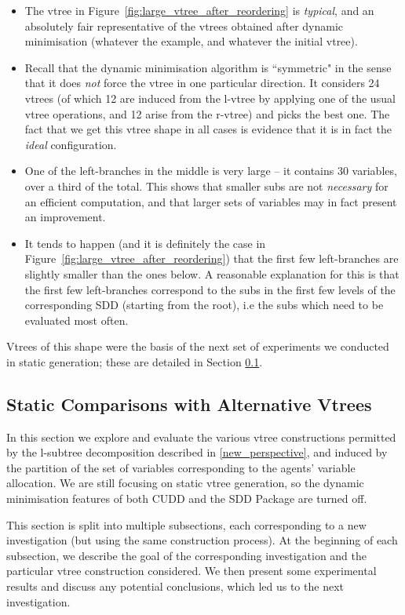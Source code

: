 \documentclass[11pt]{article}
\begin{document}
\begin{itemize}
\item The vtree in Figure~\ref{fig:large_vtree_after_reordering} is \textit{typical}, and an absolutely fair representative of the vtrees obtained after dynamic minimisation (whatever the example, and whatever the initial vtree).
\item Recall that the dynamic minimisation algorithm is ``symmetric" in the sense that it does \textit{not} force the vtree in one particular direction. It considers 24 vtrees (of which 12 are induced from the l-vtree by applying one of the usual vtree operations, and 12 arise from the r-vtree) and picks the best one. The fact that we get this vtree shape in all cases is evidence that it is in fact the \textit{ideal} configuration. 
\item One of the left-branches in the middle is very large -- it contains 30 variables, over a third of the total. This shows that smaller subs are not \textit{necessary }for an efficient computation, and that larger sets of variables may in fact present an improvement. 
\item It tends to happen (and it is definitely the case in Figure~\ref{fig:large_vtree_after_reordering}) that the first few left-branches are slightly smaller than the ones below. A reasonable explanation for this is that the first few left-branches correspond to the subs in the first few levels of the corresponding SDD (starting from the root), i.e the subs which need to be evaluated most often.
\end{itemize}
Vtrees of this shape were the basis of the next set of experiments we conducted in static generation; these are detailed in Section \ref{alternative}.


\subsection{Static Comparisons with Alternative Vtrees}
\label{alternative}

In this section we explore and evaluate the various vtree constructions permitted by the l-subtree decomposition described in \ref{new_perspective}, and induced by the partition of the set of variables corresponding to the agents' variable allocation. We are still focusing on static vtree generation, so the dynamic minimisation features of both CUDD and the SDD Package are turned off.

This section is split into multiple subsections, each corresponding to a new investigation (but using the same construction process). At the beginning of each subsection, we describe the goal of the corresponding investigation and the particular vtree construction considered. We then present some experimental results and discuss any potential conclusions, which led us to the next investigation. 
\end{document}
